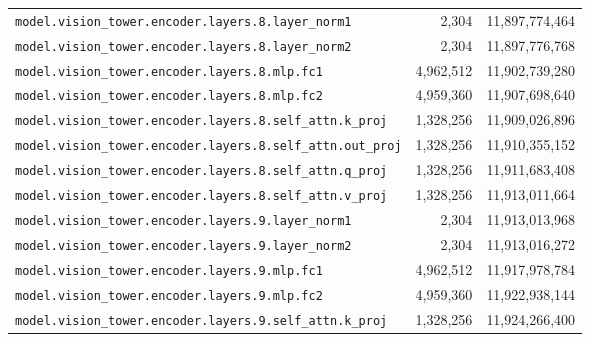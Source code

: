 \documentclass[10pt,a4paper]{article}
\theoremstyle{definition}
\begin{document}
\begin{appendices}
\begin{longtable}{p{9.5cm}rr}
\texttt{model.\allowbreak{}vision\_tower.\allowbreak{}encoder.\allowbreak{}layers.\allowbreak{}8.\allowbreak{}layer\_norm1} & 2,304 & 11,897,774,464 \\
\texttt{model.\allowbreak{}vision\_tower.\allowbreak{}encoder.\allowbreak{}layers.\allowbreak{}8.\allowbreak{}layer\_norm2} & 2,304 & 11,897,776,768 \\
\texttt{model.\allowbreak{}vision\_tower.\allowbreak{}encoder.\allowbreak{}layers.\allowbreak{}8.\allowbreak{}mlp.\allowbreak{}fc1} & 4,962,512 & 11,902,739,280 \\
\texttt{model.\allowbreak{}vision\_tower.\allowbreak{}encoder.\allowbreak{}layers.\allowbreak{}8.\allowbreak{}mlp.\allowbreak{}fc2} & 4,959,360 & 11,907,698,640 \\
\texttt{model.\allowbreak{}vision\_tower.\allowbreak{}encoder.\allowbreak{}layers.\allowbreak{}8.\allowbreak{}self\_attn.\allowbreak{}k\_proj} & 1,328,256 & 11,909,026,896 \\
\texttt{model.\allowbreak{}vision\_tower.\allowbreak{}encoder.\allowbreak{}layers.\allowbreak{}8.\allowbreak{}self\_attn.\allowbreak{}out\_proj} & 1,328,256 & 11,910,355,152 \\
\texttt{model.\allowbreak{}vision\_tower.\allowbreak{}encoder.\allowbreak{}layers.\allowbreak{}8.\allowbreak{}self\_attn.\allowbreak{}q\_proj} & 1,328,256 & 11,911,683,408 \\
\texttt{model.\allowbreak{}vision\_tower.\allowbreak{}encoder.\allowbreak{}layers.\allowbreak{}8.\allowbreak{}self\_attn.\allowbreak{}v\_proj} & 1,328,256 & 11,913,011,664 \\
\texttt{model.\allowbreak{}vision\_tower.\allowbreak{}encoder.\allowbreak{}layers.\allowbreak{}9.\allowbreak{}layer\_norm1} & 2,304 & 11,913,013,968 \\
\texttt{model.\allowbreak{}vision\_tower.\allowbreak{}encoder.\allowbreak{}layers.\allowbreak{}9.\allowbreak{}layer\_norm2} & 2,304 & 11,913,016,272 \\
\texttt{model.\allowbreak{}vision\_tower.\allowbreak{}encoder.\allowbreak{}layers.\allowbreak{}9.\allowbreak{}mlp.\allowbreak{}fc1} & 4,962,512 & 11,917,978,784 \\
\texttt{model.\allowbreak{}vision\_tower.\allowbreak{}encoder.\allowbreak{}layers.\allowbreak{}9.\allowbreak{}mlp.\allowbreak{}fc2} & 4,959,360 & 11,922,938,144 \\
\texttt{model.\allowbreak{}vision\_tower.\allowbreak{}encoder.\allowbreak{}layers.\allowbreak{}9.\allowbreak{}self\_attn.\allowbreak{}k\_proj} & 1,328,256 & 11,924,266,400 \\

\end{longtable}
\end{appendices}
\end{document}
